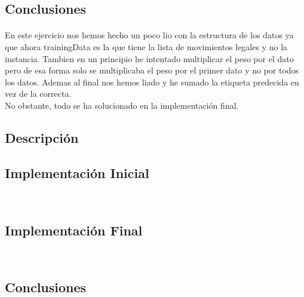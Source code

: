 \documentclass{report}
\begin{document}
      \subsection*{Conclusiones}
        \paragraph*{}{
          En este ejercicio nos hemos hecho un poco lio con la estructura de los datos ya que ahora trainingData es la que tiene la lista de movimientos legales y no la instancia.
          Tambien en un principio he intentado multiplicar el peso por el dato pero de esa forma solo se multiplicaba el peso por el primer dato y no por todos los datos.
          Ademas al final nos hemos liado y he sumado la etiqueta predecida en vez de la correcta.\\

          No obstante, todo se ha solucionado en la implementación final.
        }
      \subsection*{Descripción}
        \paragraph*{}{

        }
      \subsection*{Implementación Inicial}
        \begin{lstlisting}[language=Python, caption=Implementación inicial del clonador de comportamiento del pacman con rasgos diseñados por nosotros]
          
        \end{lstlisting}
      \subsection*{Implementación Final}
        \begin{lstlisting}[language=Python, caption=Implementación inicial del clonador de comportamiento del pacman con rasgos diseñados por nosotros]
            
        \end{lstlisting}
      \subsection*{Conclusiones}
\end{document}
